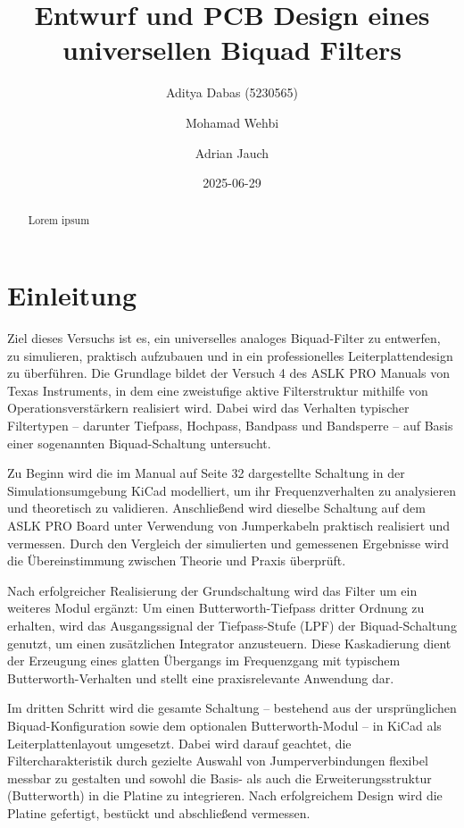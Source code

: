\documentclass[
  ngerman,
  letterpaper,
  DIV=11]{scrreprt}
\title{Entwurf und PCB Design eines universellen Biquad Filters}
\author{Aditya Dabas (5230565) \and Mohamad Wehbi \and Adrian Jauch}
\date{2025-06-29}
\renewcommand*\contentsname{Inhaltsverzeichnis}
\newcommand\contentsname{Inhaltsverzeichnis}
\begin{document}
\maketitle
\begin{abstract}
Lorem ipsum
\end{abstract}

\renewcommand*\contentsname{Inhaltsverzeichnis}
{
\hypersetup{linkcolor=}
\setcounter{tocdepth}{2}
\tableofcontents
}

\chapter{Einleitung}\label{einleitung}

Ziel dieses Versuchs ist es, ein universelles analoges Biquad-Filter zu
entwerfen, zu simulieren, praktisch aufzubauen und in ein
professionelles Leiterplattendesign zu überführen. Die Grundlage bildet
der Versuch 4 des ASLK PRO Manuals von Texas Instruments, in dem eine
zweistufige aktive Filterstruktur mithilfe von Operationsverstärkern
realisiert wird. Dabei wird das Verhalten typischer Filtertypen --
darunter Tiefpass, Hochpass, Bandpass und Bandsperre -- auf Basis einer
sogenannten Biquad-Schaltung untersucht.

Zu Beginn wird die im Manual auf Seite 32 dargestellte Schaltung in der
Simulationsumgebung KiCad modelliert, um ihr Frequenzverhalten zu
analysieren und theoretisch zu validieren. Anschließend wird dieselbe
Schaltung auf dem ASLK PRO Board unter Verwendung von Jumperkabeln
praktisch realisiert und vermessen. Durch den Vergleich der simulierten
und gemessenen Ergebnisse wird die Übereinstimmung zwischen Theorie und
Praxis überprüft.

Nach erfolgreicher Realisierung der Grundschaltung wird das Filter um
ein weiteres Modul ergänzt: Um einen Butterworth-Tiefpass dritter
Ordnung zu erhalten, wird das Ausgangssignal der Tiefpass-Stufe (LPF)
der Biquad-Schaltung genutzt, um einen zusätzlichen Integrator
anzusteuern. Diese Kaskadierung dient der Erzeugung eines glatten
Übergangs im Frequenzgang mit typischem Butterworth-Verhalten und stellt
eine praxisrelevante Anwendung dar.

Im dritten Schritt wird die gesamte Schaltung -- bestehend aus der
ursprünglichen Biquad-Konfiguration sowie dem optionalen
Butterworth-Modul -- in KiCad als Leiterplattenlayout umgesetzt. Dabei
wird darauf geachtet, die Filtercharakteristik durch gezielte Auswahl
von Jumperverbindungen flexibel messbar zu gestalten und sowohl die
Basis- als auch die Erweiterungsstruktur (Butterworth) in die Platine zu
integrieren. Nach erfolgreichem Design wird die Platine gefertigt,
bestückt und abschließend vermessen.
\end{document}
